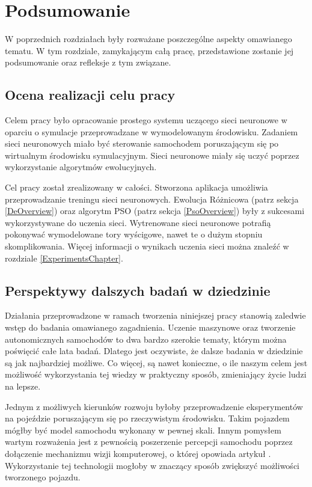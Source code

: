 \chapter*{Podsumowanie}

W poprzednich rozdziałach były rozważane poszczególne aspekty omawianego tematu. W tym rozdziale, zamykającym całą pracę, przedstawione zostanie jej podsumowanie oraz refleksje z tym związane.

\section*{Ocena realizacji celu pracy}
Celem pracy było opracowanie prostego systemu uczącego sieci neuronowe w oparciu o symulacje przeprowadzane w wymodelowanym środowisku. Zadaniem sieci neuronowych miało być sterowanie samochodem poruszającym się po wirtualnym środowisku symulacyjnym. Sieci neuronowe miały się uczyć poprzez wykorzystanie algorytmów ewolucyjnych.

Cel pracy został zrealizowany w całości. Stworzona aplikacja umożliwia przeprowadzanie treningu sieci neuronowych. Ewolucja Różnicowa (patrz sekcja \ref{DeOverview}) oraz algorytm PSO (patrz sekcja \ref{PsoOverview}) były z sukcesami wykorzystywane do uczenia sieci. Wytrenowane sieci neuronowe potrafią pokonywać wymodelowane tory wyścigowe, nawet te o dużym stopniu skomplikowania. Więcej informacji o wynikach uczenia sieci można znaleźć w rozdziale \ref{ExperimentsChapter}.

\section*{Perspektywy dalszych badań w dziedzinie}
Działania przeprowadzone w ramach tworzenia niniejszej pracy stanowią zaledwie wstęp do badania omawianego zagadnienia. Uczenie maszynowe oraz tworzenie autonomicznych samochodów to dwa bardzo szerokie tematy, którym można poświęcić całe lata badań. Dlatego jest oczywiste, że dalsze badania w dziedzinie są jak najbardziej możliwe. Co więcej, są nawet konieczne, o ile naszym celem jest możliwość wykorzystania tej wiedzy w praktyczny sposób, zmieniający życie ludzi na lepsze.

Jednym z możliwych kierunków rozwoju byłoby przeprowadzenie eksperymentów na pojeździe poruszającym się po rzeczywistym środowisku. Takim pojazdem mógłby być model samochodu wykonany w pewnej skali. Innym pomysłem wartym rozważenia jest z pewnością poszerzenie percepcji samochodu poprzez dołączenie mechanizmu wizji komputerowej, o której opowiada artykuł \cite{computerVision:overview}. Wykorzystanie tej technologii mogłoby w znaczący sposób zwiększyć możliwości tworzonego pojazdu.

